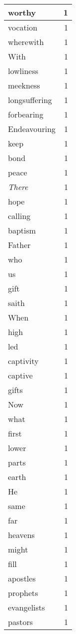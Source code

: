 \begin{center}
\begin{longtable}{l|r}
worthy & 1\\ \hline 
vocation & 1\\ \hline 
wherewith & 1\\ \hline 
With & 1\\ \hline 
lowliness & 1\\ \hline 
meekness & 1\\ \hline 
longsuffering & 1\\ \hline 
forbearing & 1\\ \hline 
Endeavouring & 1\\ \hline 
keep & 1\\ \hline 
bond & 1\\ \hline 
peace & 1\\ \hline 
\emph{There} & 1\\ \hline 
hope & 1\\ \hline 
calling & 1\\ \hline 
baptism & 1\\ \hline 
Father & 1\\ \hline 
who & 1\\ \hline 
us & 1\\ \hline 
gift & 1\\ \hline 
saith & 1\\ \hline 
When & 1\\ \hline 
high & 1\\ \hline 
led & 1\\ \hline 
captivity & 1\\ \hline 
captive & 1\\ \hline 
gifts & 1\\ \hline 
Now & 1\\ \hline 
what & 1\\ \hline 
first & 1\\ \hline 
lower & 1\\ \hline 
parts & 1\\ \hline 
earth & 1\\ \hline 
He & 1\\ \hline 
same & 1\\ \hline 
far & 1\\ \hline 
heavens & 1\\ \hline 
might & 1\\ \hline 
fill & 1\\ \hline 
apostles & 1\\ \hline 
prophets & 1\\ \hline 
evangelists & 1\\ \hline 
pastors & 1\\ \hline 

\end{longtable}
\end{center}
